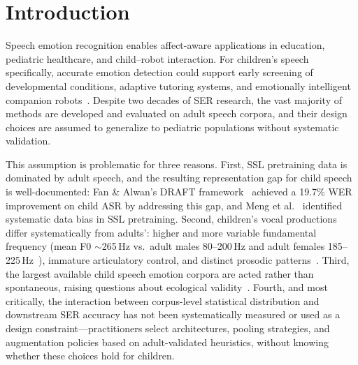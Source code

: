 \documentclass[11pt,a4paper]{article}
\begin{document}

\section{Introduction}
\label{sec:introduction}

Speech emotion recognition enables affect-aware applications in education,
pediatric healthcare, and child--robot interaction. For children's speech
specifically, accurate emotion detection could support early screening of
developmental conditions, adaptive tutoring systems, and emotionally
intelligent companion robots~\cite{batliner2011fau}. Despite two decades of SER
research, the vast majority of methods are developed and evaluated on adult
speech corpora, and their design choices are assumed to generalize to pediatric
populations without systematic validation.

This assumption is problematic for three reasons. First, SSL pretraining data
is dominated by adult speech, and the resulting representation gap for child
speech is well-documented: Fan \& Alwan's DRAFT framework~\cite{fan2023draft}
achieved a 19.7\% WER improvement on child ASR by addressing this gap, and
Meng et al.~\cite{meng2022data} identified systematic data bias in SSL
pretraining. Second, children's vocal productions differ systematically from
adults': higher and more variable
fundamental frequency (mean F0 $\sim$265\,Hz vs.\ adult males 80--200\,Hz
and adult females 185--225\,Hz~\cite{ncvs2025normative}), immature
articulatory control, and distinct prosodic
patterns~\cite{lee2007interspeech,tavares2010normative}. Third, the largest
available child speech emotion corpora are acted rather than spontaneous,
raising questions about ecological validity~\cite{batliner2011fau}. Fourth, and
most critically, the interaction between corpus-level statistical distribution
and downstream SER accuracy has not been systematically measured or used as a
design constraint---practitioners select architectures, pooling strategies, and
augmentation policies based on adult-validated heuristics, without knowing
whether these choices hold for children.
\end{document}
